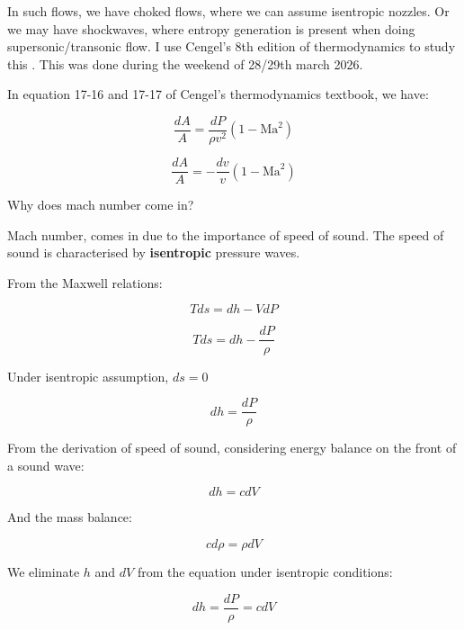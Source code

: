\documentclass[masters]{ucbthesis}
\renewcommand{\_}{\kern-1.5pt\textunderscore\kern-1.5pt}
\begin{document}
In such flows, we have choked flows, where we can assume isentropic 
nozzles. Or we may have shockwaves, where entropy generation is present 
when doing supersonic/transonic flow. I use Cengel's 8th edition of 
thermodynamics to study this \citep{cengel2002thermodynamics}. 
This was done during the weekend of 28/29th march 2026.

In equation 17-16 and 17-17 of Cengel's thermodynamics textbook, 
we have:

\begin{equation}
	\frac{dA}{A} = \frac{dP}{\rho v^2} (1 - \text{Ma}^2)
\end{equation}

\begin{equation}
	\frac{dA}{A} = -\frac{dv}{v} (1 - \text{Ma}^2)
\end{equation}

Why does mach number come in?

Mach number, comes in due to the importance of speed of sound. The speed 
of sound is characterised by \textbf{isentropic} pressure waves.

From the Maxwell relations:

\begin{equation*}
	T ds = dh - V dP
\end{equation*}

\begin{equation*}
	T ds = dh -  \frac{dP}{\rho}
\end{equation*}

Under isentropic assumption, $ds = 0$

\begin{equation*}
	dh =   \frac{dP}{\rho}
\end{equation*}

From the derivation of speed of sound, considering energy balance 
on the front of a sound wave:

\begin{equation*}
	dh =  c dV
\end{equation*}

And the mass balance:

\begin{equation*}
	c d\rho  = \rho dV
\end{equation*}



We eliminate $h$ and $dV$ from the equation under isentropic conditions:

\begin{equation*}
	dh = \frac{dP}{\rho} =  c dV
\end{equation*}
\end{document}
